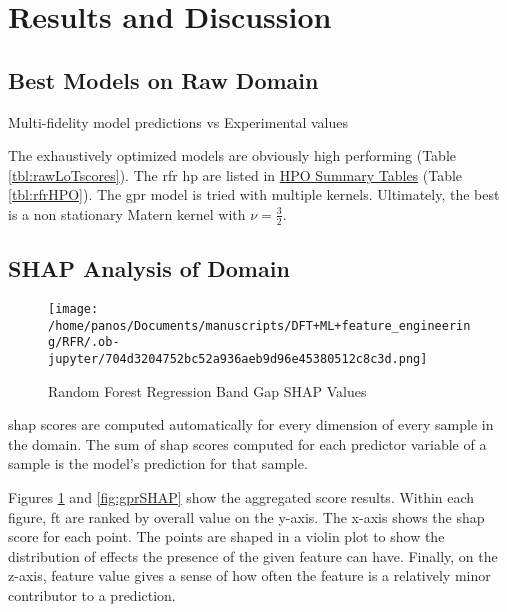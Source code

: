 \documentclass[aip, jmp, amsmath, amssymb, nofootinbib]{revtex4-2}
\begin{document}
\section*{Results and Discussion}
\label{sec:org3f0f813}
\subsection*{Best Models on Raw Domain}
\label{sec:orge2ac52a}
 
\begin{multicol}
\centering

\caption{\label{fig:pairplots} Multi-fidelity model predictions vs Experimental values}
\end{multicol}

The exhaustively optimized models are obviously high performing (Table
\ref{tbl:rawLoTscores}). The \acrshort{rfr} \gls{hp} are listed in \hyperref[sec:org9b65e5b]{HPO Summary Tables} (Table \ref{tbl:rfrHPO}). The \acrshort{gpr} model is tried with
multiple kernels. Ultimately, the best is a non stationary Matern
kernel with \(\nu = \frac{3}{2}\).

\subsection*{SHAP Analysis of Domain}
\label{sec:org3a8213a}
\begin{figure}[htbp]
\centering
\texttt{[image: /home/panos/Documents/manuscripts/DFT+ML+feature\_engineering/RFR/.ob-jupyter/704d3204752bc52a936aeb9d96e45380512c8c3d.png]}
\caption{\label{fig:rfrSHAP} Random Forest Regression Band Gap SHAP Values}
\end{figure}

\acrshort{shap} scores are computed automatically for every dimension of every
sample in the domain. The sum of \acrshort{shap} scores computed for each
predictor variable of a sample is the model's prediction for that
sample\cite{lundberg-2017-unified-approac}.

Figures \ref{fig:rfrSHAP} and \ref{fig:gprSHAP} show the aggregated score
results. Within each figure, \gls{ft} are ranked by overall value on
the y-axis. The x-axis shows the \acrshort{shap} score for each point. The points
are shaped in a violin plot to show the distribution of effects the
presence of the given feature can have. Finally, on the z-axis,
feature value gives a sense of how often the feature is a relatively
minor contributor to a prediction.
\end{document}
